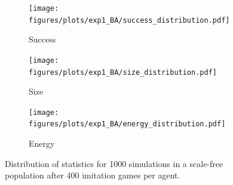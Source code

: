 \documentclass{article}
\begin{document}
\begin{figure}[b]
    \centering
    \begin{subfigure}{.33\textwidth}
        \centering
        \texttt{[image: figures/plots/exp1\_BA/success\_distribution.pdf]}
        \caption{Success}
        \label{fig:BA_stats_success}
    \end{subfigure}%
    \begin{subfigure}{.33\textwidth}
        \centering
        \texttt{[image: figures/plots/exp1\_BA/size\_distribution.pdf]}
        \caption{Size}
        \label{fig:BA_stats_size}
    \end{subfigure}%
    \begin{subfigure}{.33\textwidth}
        \centering
        \texttt{[image: figures/plots/exp1\_BA/energy\_distribution.pdf]}
        \caption{Energy}
        \label{fig:BA_stats_energy}
    \end{subfigure}%
    \caption{Distribution of statistics for 1000 simulations in a scale-free population after 400 imitation games
        per agent.}
    \label{fig:BA_stats}
\end{figure}


\end{document}

